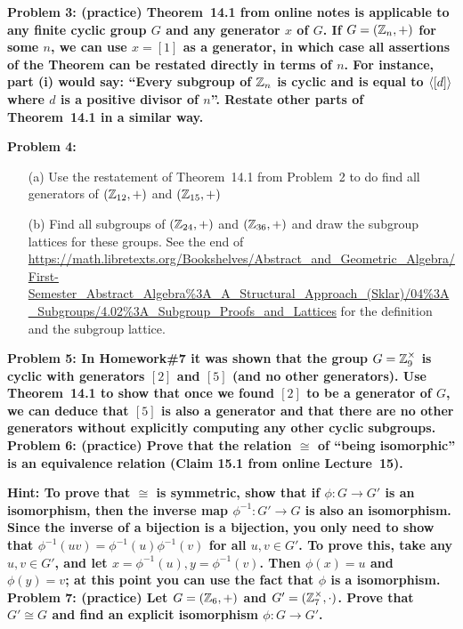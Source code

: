 \documentclass[11pt]{amsart}
\begin{document}
\bf{Problem 3: }\rm (practice)
Theorem~14.1 from online notes is applicable to any finite cyclic group $G$ and any generator $x$ of $G$.
If $G=({\mathbb Z}_n,+)$ for some $n$, we can use $x=[1]$ as a generator, in which case all assertions of the Theorem
can be restated directly in terms of $n$. For instance, part (i) would say:
``Every subgroup of ${\mathbb Z}_n$ is cyclic and is equal to ${\langle} [d]{\rangle}$
where $d$ is a positive divisor of $n$''. Restate other parts of Theorem~14.1 in a similar way.


\bf{Problem 4: }\rm  
\begin{itemize}
\item[(a)]  Use the restatement of Theorem~14.1 from Problem~2 to do find all generators of $({\mathbb Z}_{12},+)$ and $({\mathbb Z}_{15},+)$
\item[(b)] Find all subgroups of  $({\mathbb Z}_{24},+)$ and $({\mathbb Z}_{36},+)$ and draw the subgroup lattices for these groups.
See the end of
\skv
\url{https://math.libretexts.org/Bookshelves/Abstract_and_Geometric_Algebra/First-Semester_Abstract_Algebra\%3A_A_Structural_Approach_(Sklar)/04\%3A_Subgroups/4.02\%3A_Subgroup_Proofs_and_Lattices}
\skv
for the definition and the subgroup lattice.
\end{itemize}
\skv
\bf{Problem 5: }\rm In Homework\#7 it was shown that the group $G={\mathbb Z}_9^{\times}$ is cyclic with generators $[2]$ and $[5]$ (and no other generators). Use Theorem~14.1 to show that once we found $[2]$ to be a generator of $G$, we can deduce that $[5]$ is also a generator and that there are no other generators without explicitly computing any other cyclic subgroups. 
\skv
\bf{Problem 6: }\rm (practice)  Prove  that
the relation $\cong$ of ``being isomorphic'' is
an equivalence relation (Claim 15.1 from online Lecture~15).

\bf{Hint: }\rm To prove that $\cong$ is symmetric, show that
if $\phi: G\to G'$ is an isomorphism, then the inverse map
$\phi^{-1}:G'\to G$ is also an isomorphism. Since the inverse
of a bijection is a bijection, you only  need to show that
$\phi^{-1}(uv)=\phi^{-1}(u)\phi^{-1}(v)$ for all $u,v\in G'$.
To prove this, take any $u,v\in G'$, and let $x=\phi^{-1}(u), y=\phi^{-1}(v)$.
Then $\phi(x)=u$ and $\phi(y)=v$; at this point you
can use the fact that $\phi$ is a isomorphism.
\skv
\bf{Problem 7: } \rm (practice)
Let $G=({\mathbb Z}_6,+)$ and $G'=({\mathbb Z}_7^{\times},\cdot)$.
Prove that $G'\cong G$ and find an explicit isomorphism $\phi:G\to G'$.
\skv
\end{document}
